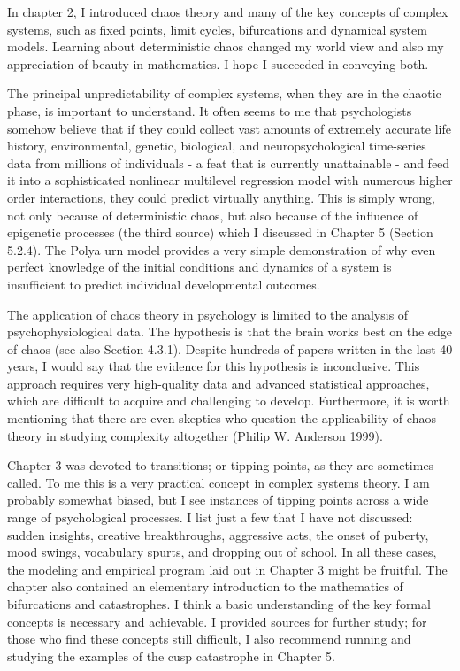 \documentclass[
  letterpaper,
]{scrbook}
\begin{document}
In chapter 2, I introduced chaos theory and many of the key concepts of
complex systems, such as fixed points, limit cycles, bifurcations and
dynamical system models. Learning about deterministic chaos changed my
world view and also my appreciation of beauty in mathematics. I hope I
succeeded in conveying both.

The principal unpredictability of complex systems, when they are in the
chaotic phase, is important to understand. It often seems to me that
psychologists somehow believe that if they could collect vast amounts of
extremely accurate life history, environmental, genetic, biological, and
neuropsychological time-series data from millions of individuals - a
feat that is currently unattainable - and feed it into a sophisticated
nonlinear multilevel regression model with numerous higher order
interactions, they could predict virtually anything. This is simply
wrong, not only because of deterministic chaos, but also because of the
influence of epigenetic processes (the third source) which I discussed
in Chapter 5 (Section 5.2.4). The Polya urn model provides a very simple
demonstration of why even perfect knowledge of the initial conditions
and dynamics of a system is insufficient to predict individual
developmental outcomes.

The application of chaos theory in psychology is limited to the analysis
of psychophysiological data. The hypothesis is that the brain works best
on the edge of chaos (see also Section 4.3.1). Despite hundreds of
papers written in the last 40 years, I would say that the evidence for
this hypothesis is inconclusive. This approach requires very
high-quality data and advanced statistical approaches, which are
difficult to acquire and challenging to develop. Furthermore, it is
worth mentioning that there are even skeptics who question the
applicability of chaos theory in studying complexity altogether (Philip
W. Anderson 1999).

Chapter 3 was devoted to transitions; or tipping points, as they are
sometimes called. To me this is a very practical concept in complex
systems theory. I am probably somewhat biased, but I see instances of
tipping points across a wide range of psychological processes. I list
just a few that I have not discussed: sudden insights, creative
breakthroughs, aggressive acts, the onset of puberty, mood swings,
vocabulary spurts, and dropping out of school. In all these cases, the
modeling and empirical program laid out in Chapter 3 might be fruitful.
The chapter also contained an elementary introduction to the mathematics
of bifurcations and catastrophes. I think a basic understanding of the
key formal concepts is necessary and achievable. I provided sources for
further study; for those who find these concepts still difficult, I also
recommend running and studying the examples of the cusp catastrophe in
Chapter 5.
\end{document}
